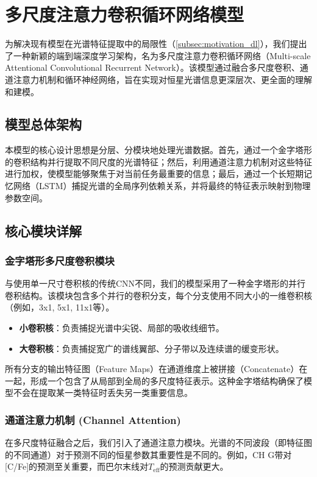 \section{多尺度注意力卷积循环网络模型}
\label{sec:model_architecture}

为解决现有模型在光谱特征提取中的局限性（\ref{subsec:motivation_dl}），我们提出了一种新颖的端到端深度学习架构，名为多尺度注意力卷积循环网络（Multi-scale Attentional Convolutional Recurrent Network）。该模型通过融合多尺度卷积、通道注意力机制和循环神经网络，旨在实现对恒星光谱信息更深层次、更全面的理解和建模。

\subsection{模型总体架构}
本模型的核心设计思想是分层、分模块地处理光谱数据。首先，通过一个金字塔形的卷积结构并行提取不同尺度的光谱特征；然后，利用通道注意力机制对这些特征进行加权，使模型能够聚焦于对当前任务最重要的信息；最后，通过一个长短期记忆网络（LSTM）捕捉光谱的全局序列依赖关系，并将最终的特征表示映射到物理参数空间。

\subsection{核心模块详解}

\subsubsection{金字塔形多尺度卷积模块}
与使用单一尺寸卷积核的传统CNN不同，我们的模型采用了一种金字塔形的并行卷积结构。该模块包含多个并行的卷积分支，每个分支使用不同大小的一维卷积核（例如，3x1, 5x1, 11x1等）。
\begin{itemize}
    \item \textbf{小卷积核}：负责捕捉光谱中尖锐、局部的吸收线细节。
    \item \textbf{大卷积核}：负责捕捉宽广的谱线翼部、分子带以及连续谱的缓变形状。
\end{itemize}
所有分支的输出特征图（Feature Maps）在通道维度上被拼接（Concatenate）在一起，形成一个包含了从局部到全局的多尺度特征表示。这种金字塔结构确保了模型不会在提取某一类特征时丢失另一类重要信息。

\subsubsection{通道注意力机制 (Channel Attention)}
在多尺度特征融合之后，我们引入了通道注意力模块。光谱的不同波段（即特征图的不同通道）对于预测不同的恒星参数其重要性是不同的。例如，CH G带对[C/Fe]的预测至关重要，而巴尔末线对$T_{\text{eff}}$的预测贡献更大。

